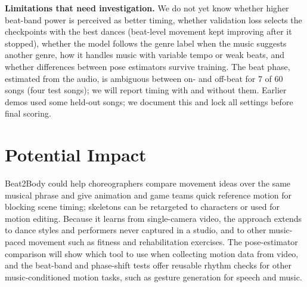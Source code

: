 \documentclass[conference,letterpaper]{IEEEtran}
\begin{document}
\textbf{Limitations that need investigation.} We do not yet know whether higher beat-band power is perceived as better timing, whether validation loss selects the checkpoints with the best dances (beat-level movement kept improving after it stopped), whether the model follows the genre label when the music suggests another genre, how it handles music with variable tempo or weak beats, and whether differences between pose estimators survive training. The beat phase, estimated from the audio, is ambiguous between on- and off-beat for 7 of 60 songs (four test songs); we will report timing with and without them. Earlier demos used some held-out songs; we document this and lock all settings before final scoring.

\balance
\section{Potential Impact}
Beat2Body could help choreographers compare movement ideas over the same musical phrase and give animation and game teams quick reference motion for blocking scene timing; skeletons can be retargeted to characters or used for motion editing. Because it learns from single-camera video, the approach extends to dance styles and performers never captured in a studio, and to other music-paced movement such as fitness and rehabilitation exercises. The pose-estimator comparison will show which tool to use when collecting motion data from video, and the beat-band and phase-shift tests offer reusable rhythm checks for other music-conditioned motion tasks, such as gesture generation for speech and music.
\end{document}
